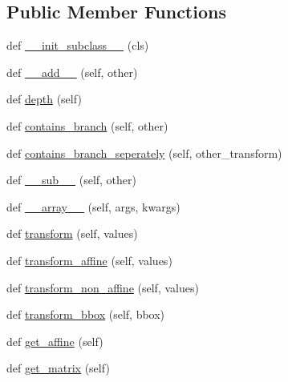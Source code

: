 \subsection*{Public Member Functions}
\begin{DoxyCompactItemize}
\item 
def \hyperlink{classmatplotlib_1_1transforms_1_1Transform_a1fc178971ba9c826d86e196d1c1aac20}{\+\_\+\+\_\+init\+\_\+subclass\+\_\+\+\_\+} (cls)
\item 
def \hyperlink{classmatplotlib_1_1transforms_1_1Transform_a31fb50cbd6cef81aa01a2d9977528da6}{\+\_\+\+\_\+add\+\_\+\+\_\+} (self, other)
\item 
def \hyperlink{classmatplotlib_1_1transforms_1_1Transform_afddcaf14031c8ee61890b0306adb71ed}{depth} (self)
\item 
def \hyperlink{classmatplotlib_1_1transforms_1_1Transform_af83fa5fa2bd74e402f7cf30d0c6d0a75}{contains\+\_\+branch} (self, other)
\item 
def \hyperlink{classmatplotlib_1_1transforms_1_1Transform_a7c31b4e3f8b8b73cd7dca724be0d9a17}{contains\+\_\+branch\+\_\+seperately} (self, other\+\_\+transform)
\item 
def \hyperlink{classmatplotlib_1_1transforms_1_1Transform_a0d3d7f11e49556cea178d7110350572d}{\+\_\+\+\_\+sub\+\_\+\+\_\+} (self, other)
\item 
def \hyperlink{classmatplotlib_1_1transforms_1_1Transform_a43fce7ae28a7b4801ccd4bde51ac9200}{\+\_\+\+\_\+array\+\_\+\+\_\+} (self, args, kwargs)
\item 
def \hyperlink{classmatplotlib_1_1transforms_1_1Transform_a8ed5dd2238236f5f238726473f93942d}{transform} (self, values)
\item 
def \hyperlink{classmatplotlib_1_1transforms_1_1Transform_aae16cba4769018c803bf591dfd01bae1}{transform\+\_\+affine} (self, values)
\item 
def \hyperlink{classmatplotlib_1_1transforms_1_1Transform_a3b6fee992defc1eff51988efbc5c1780}{transform\+\_\+non\+\_\+affine} (self, values)
\item 
def \hyperlink{classmatplotlib_1_1transforms_1_1Transform_a02f3d6a939960103da7e6e0c617e3298}{transform\+\_\+bbox} (self, bbox)
\item 
def \hyperlink{classmatplotlib_1_1transforms_1_1Transform_a590587b99bea670e821c6c65cf669c49}{get\+\_\+affine} (self)
\item 
def \hyperlink{classmatplotlib_1_1transforms_1_1Transform_a88c05fdde2e3ccb870217439d4785dff}{get\+\_\+matrix} (self)
\item 

\end{DoxyCompactItemize}

